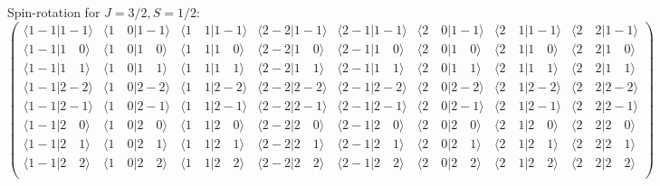 \documentclass{article}
\begin{document}
Spin-rotation for $J=3/2,S=1/2$:
\[
\left(
\begin{array}{ccc|ccccc}
\langle1-1|1-1\rangle & \langle1\quad0|1-1\rangle & \langle1\quad1|1-1\rangle & \langle2-2|1-1\rangle & \langle2-1|1-1\rangle & \langle2\quad0|1-1\rangle & \langle2\quad1|1-1\rangle & \langle2\quad2|1-1\rangle  \\
\langle1-1|1\quad0\rangle & \langle1\quad0|1\quad0\rangle & \langle1\quad1|1\quad0\rangle & \langle2-2|1\quad0\rangle & \langle2-1|1\quad0\rangle & \langle2\quad0|1\quad0\rangle & \langle2\quad1|1\quad0\rangle & \langle2\quad2|1\quad0\rangle  \\
\langle1-1|1\quad1\rangle & \langle1\quad0|1\quad1\rangle & \langle1\quad1|1\quad1\rangle & \langle2-2|1\quad1\rangle & \langle2-1|1\quad1\rangle & \langle2\quad0|1\quad1\rangle & \langle2\quad1|1\quad1\rangle & \langle2\quad2|1\quad1\rangle  \\
\hline
\langle1-1|2-2\rangle & \langle1\quad0|2-2\rangle & \langle1\quad1|2-2\rangle & \langle2-2|2-2\rangle & \langle2-1|2-2\rangle & \langle2\quad0|2-2\rangle & \langle2\quad1|2-2\rangle & \langle2\quad2|2-2\rangle  \\
\langle1-1|2-1\rangle & \langle1\quad0|2-1\rangle & \langle1\quad1|2-1\rangle & \langle2-2|2-1\rangle & \langle2-1|2-1\rangle & \langle2\quad0|2-1\rangle & \langle2\quad1|2-1\rangle & \langle2\quad2|2-1\rangle  \\
\langle1-1|2\quad0\rangle & \langle1\quad0|2\quad0\rangle & \langle1\quad1|2\quad0\rangle & \langle2-2|2\quad0\rangle & \langle2-1|2\quad0\rangle & \langle2\quad0|2\quad0\rangle & \langle2\quad1|2\quad0\rangle & \langle2\quad2|2\quad0\rangle  \\
\langle1-1|2\quad1\rangle & \langle1\quad0|2\quad1\rangle & \langle1\quad1|2\quad1\rangle & \langle2-2|2\quad1\rangle & \langle2-1|2\quad1\rangle & \langle2\quad0|2\quad1\rangle & \langle2\quad1|2\quad1\rangle & \langle2\quad2|2\quad1\rangle  \\
\langle1-1|2\quad2\rangle & \langle1\quad0|2\quad2\rangle & \langle1\quad1|2\quad2\rangle & \langle2-2|2\quad2\rangle & \langle2-1|2\quad2\rangle & \langle2\quad0|2\quad2\rangle & \langle2\quad1|2\quad2\rangle & \langle2\quad2|2\quad2\rangle  \\
\end{array}
\right)
\]
\end{document}
